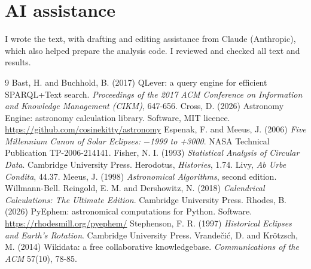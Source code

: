 \documentclass[11pt,a4paper]{article}
\begin{document}
\section*{AI assistance}
I wrote the text, with drafting and editing assistance from Claude (Anthropic), which also helped prepare the analysis code. I reviewed and checked all text and results.

\begin{thebibliography}{9}
 Bast, H. and Buchhold, B. (2017) QLever: a query engine for efficient SPARQL+Text search. \textit{Proceedings of the 2017 ACM Conference on Information and Knowledge Management (CIKM)}, 647-656.
 Cross, D. (2026) Astronomy Engine: astronomy calculation library. Software, MIT licence. \url{https://github.com/cosinekitty/astronomy}
 Espenak, F. and Meeus, J. (2006) \textit{Five Millennium Canon of Solar Eclipses: $-$1999 to +3000}. NASA Technical Publication TP-2006-214141.
 Fisher, N. I. (1993) \textit{Statistical Analysis of Circular Data}. Cambridge University Press.
 Herodotus, \textit{Histories}, 1.74.
 Livy, \textit{Ab Urbe Condita}, 44.37.
 Meeus, J. (1998) \textit{Astronomical Algorithms}, second edition. Willmann-Bell.
 Reingold, E. M. and Dershowitz, N. (2018) \textit{Calendrical Calculations: The Ultimate Edition}. Cambridge University Press.
 Rhodes, B. (2026) PyEphem: astronomical computations for Python. Software. \url{https://rhodesmill.org/pyephem/}
 Stephenson, F. R. (1997) \textit{Historical Eclipses and Earth's Rotation}. Cambridge University Press.
 Vrande\v{c}i\'{c}, D. and Kr\"{o}tzsch, M. (2014) Wikidata: a free collaborative knowledgebase. \textit{Communications of the ACM} 57(10), 78-85.
\end{thebibliography}
\end{document}
